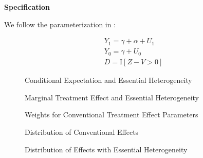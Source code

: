 \begin{frame}
\textbf{Specification}

We follow the parameterization in \citet{Heckman.2005e}:

\begin{align*}
Y_1 = \gamma + \alpha + U_1  \\
Y_0 = \gamma + U_0     \\
D = \mathrm{I}[Z - V > 0]
\end{align*}
\end{frame}










\begin{frame}
\begin{figure}\caption{Conditional Expectation and Essential Heterogeneity}
\end{figure}
\end{frame}

\begin{frame}
\begin{figure}\caption{Marginal Treatment Effect and Essential Heterogeneity}
\end{figure}
\end{frame}

\begin{frame}
\begin{figure}\caption{Weights for Conventional Treatment Effect Parameters}
\end{figure}
\end{frame}


\begin{frame}
\begin{figure}\caption{Distribution of Conventional Effects}
\end{figure}
\end{frame}

\begin{frame}
\begin{figure}\caption{Distribution of Effects with Essential Heterogeneity}
\end{figure}
\end{frame}


